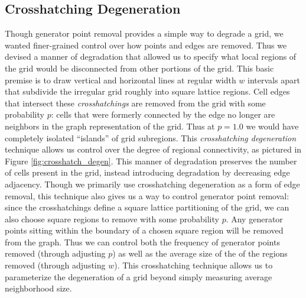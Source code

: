 \documentclass[a4paper,11pt,twoside]{report}
\begin{document}
\subsection{Crosshatching Degeneration}
\label{subsec:ch_degen}
Though generator point removal provides a simple way to degrade a grid, we wanted finer-grained control over how points and edges are removed. Thus we devised a manner of degradation that allowed us to specify what local regions of the grid would be disconnected from other portions of the grid. This basic premise is to draw vertical and horizontal lines at regular width $w$ intervals apart that subdivide the irregular grid roughly into square lattice regions. Cell edges that intersect these \textit{crosshatchings} are removed from the grid with some probability $p$: cells that were formerly connected by the edge no longer are neighbors in the graph representation of the grid. Thus at $p=1.0$ we would have completely isolated ``islands'' of grid subregions. This \textit{crosshatching degeneration} technique allows us control over the degree of regional connectivity, as pictured in Figure \ref{fig:crosshatch_degen}. This manner of degradation preserves the number of cells present in the grid, instead introducing degradation by decreasing edge adjacency. Though we primarily use crosshatching degeneration as a form of edge removal, this technique also gives us a way to control generator point removal: since the crosshatchings define a square lattice partitioning of the grid, we can also choose square regions to remove with some probability $p$. Any generator points sitting within the boundary of a chosen square region will be removed from the graph. Thus we can control both the frequency of generator points removed (through adjusting $p$) as well as the average size of the of the regions removed (through adjusting $w$). This crosshatching technique allows us to parameterize the degeneration of a grid beyond simply measuring average neighborhood size.
\end{document}
